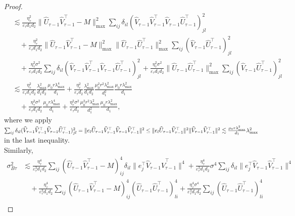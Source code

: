 \documentclass[12pt]{article}
\theoremstyle{plain}
\begin{document}
\begin{proof}
\begin{align*}
    &\lesssim \frac{\eta_{\tau}^2}{\varepsilon_{\tau}d_1d_2}\|\widehat{U}_{\tau-1}\widehat{V}_{\tau-1}^{\top} - M\|_{\max}^2\sum_{ij}\delta_{il}(\widehat{V}_{\tau-1}\widehat{V}_{\tau-1}^{\top}\widehat{V}_{\tau-1}\widehat{U}_{\tau-1}^{\top})_{jl}^2 \\&\quad + \frac{\eta_{\tau}^2}{\varepsilon_{\tau} d_1d_2}\|\widehat{U}_{\tau-1}\widehat{V}_{\tau-1}^{\top} - M\|_{\max}^2\|\widehat{U}_{\tau-1}\widehat{U}_{\tau-1}^{\top}\|_{\max}^2\sum_{ij}(\widehat{V}_{\tau-1}\widehat{U}_{\tau-1}^{\top})_{jl}^2 \\ &\quad + \frac{\eta_{\tau}^2\sigma^2}{\varepsilon_{\tau}d_1d_2}\sum_{ij}\delta_{il}(\widehat{V}_{\tau-1}\widehat{V}_{\tau-1}^{\top}\widehat{V}_{\tau-1}\widehat{U}_{\tau-1}^{\top})_{jl}^2 + \frac{\eta_{\tau}^2\sigma^2}{\varepsilon_{\tau}d_1d_2}\|\widehat{U}_{\tau-1}\widehat{U}_{\tau-1}^{\top}\|_{\max}^2\sum_{ij}(\widehat{V}_{\tau-1}\widehat{U}_{\tau-1}^{\top})_{jl}^2 \\
    &\lesssim \frac{\eta_{\tau}^2}{\varepsilon_{\tau}d_1d_2}\frac{\lambda_{\max}^2}{d_1d_2}\frac{\mu_0r\lambda_{\max}^4}{d_1} + \frac{\eta_{\tau}^2}{\varepsilon_{\tau}d_2}\frac{\lambda_{\max}^2}{d_1d_2}\frac{\mu_0^2r^2\lambda_{\max}^2}{d_1^2}\frac{\mu_0r\lambda_{\max}^2}{d_1} \\ &\quad + \frac{\eta_{\tau}^2\sigma^2}{\varepsilon_{\tau}d_1d_2}\frac{\mu_0r\lambda_{\max}^4}{d_1} + \frac{\eta_{\tau}^2\sigma^2}{\varepsilon_{\tau}d_2}\frac{\mu_0^2r^2\lambda_{\max}^2}{d_1^2}\frac{\mu_0r\lambda_{\max}^2}{d_1},
\end{align*}
where we apply $\sum_{ij}\delta_{il}(\widehat{V}_{\tau-1}\widehat{V}_{\tau-1}^{\top}\widehat{V}_{\tau-1}\widehat{U}_{\tau-1}^{\top})_{jl}^2=\|e_l\widehat{U}_{\tau-1}\widehat{V}_{\tau-1}^{\top}\widehat{V}_{\tau-1}\widehat{V}_{\tau-1}^{\top}\|^2\leq \|e_l\widehat{U}_{\tau-1}\widehat{V}_{\tau-1}^{\top}\|^2\|\widehat{V}_{\tau-1}\widehat{V}_{\tau-1}^{\top}\|^2\\ \lesssim \frac{\mu_0r\lambda_{\max}^2}{d_1}\lambda_{\max}^2$ in the last inequality. \\
Similarly,
\begin{align*}
    \sigma_{B\tau}^2&\lesssim \frac{\eta_{\tau}^4}{\varepsilon_{\tau}^3 d_1d_2}\sum_{ij}(\widehat{U}_{\tau-1}\widehat{V}_{\tau-1}^{\top} - M)_{ij}^4\delta_{il}\|e_j^{\top}\widehat{V}_{\tau-1}\widehat{V}_{\tau-1}^{\top}\|^4 + \frac{\eta_{\tau}^4}{\varepsilon_{\tau}^3 d_1d_2}\sigma^4\sum_{ij} \delta_{il}\|e_j^{\top}\widehat{V}_{\tau-1}\widehat{V}_{\tau-1}^{\top}\|^4 \\ &\quad + \frac{\eta_{\tau}^4}{\varepsilon_{\tau}^3 d_1d_2}\sum_{ij} (\widehat{U}_{\tau-1}\widehat{V}_{\tau-1}^{\top} - M)_{ij}^4(\widehat{U}_{\tau-1}\widehat{U}_{\tau-1}^{\top})_{li}^4 + \frac{\eta_{\tau}^4\sigma^4}{\varepsilon_{\tau}^3 d_1d_2}\sum_{ij} (\widehat{U}_{\tau-1}\widehat{U}_{\tau-1}^{\top})_{li}^4 \\

\end{align*}
\end{proof}
\end{document}

